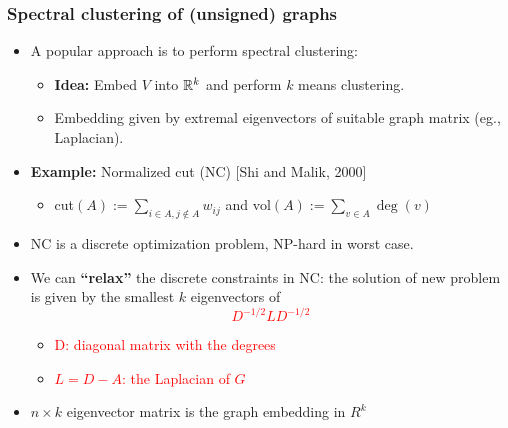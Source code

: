 \documentclass[dvipsnames,mathserif]{beamer}
\newcommand\mypv{\vfill \ifthenelse{\boolean{withPause}}{ \pause }{}}
\begin{document}
\begin{frame}
\frametitle{\large Spectral clustering of (unsigned) graphs}
\begin{itemize}

\item A popular approach is to perform spectral clustering: 
\begin{itemize}
	\item \textbf{Idea:} Embed $V$ into $\mathbb{R}^k$ and perform $k$ means clustering.
	\item Embedding given by extremal eigenvectors of suitable graph matrix (eg., Laplacian).
\end{itemize}


\item \textbf{Example:} Normalized cut (NC) [{\footnotesize{Shi and Malik, 2000}}]
\vspace{-2mm}

\begin{itemize}
	\item  cut$(A):= \sum_{i \in A, j\not\in A} w_{ij}$ and $\text{vol}(A) := \sum_{v \in A} \deg(v)$
\end{itemize}

%
\item NC is a discrete optimization problem, NP-hard in worst case.

\item We can  \textbf{``relax''} the discrete constraints in NC: the solution of new problem is given 
by the smallest $k$ eigenvectors of 
\textcolor{red}{ $$D^{-1/2} L D^{-1/2}$$ }
\vspace{-4mm}

\begin{itemize}
\item \textcolor{red}{D: diagonal matrix with the degrees}
\item \textcolor{red}{$L=D-A$: the Laplacian of $G$ }
\end{itemize}

\item  $n \times k$ eigenvector matrix is the graph embedding in $R^k$
\end{itemize}



\end{frame}
\end{document}

